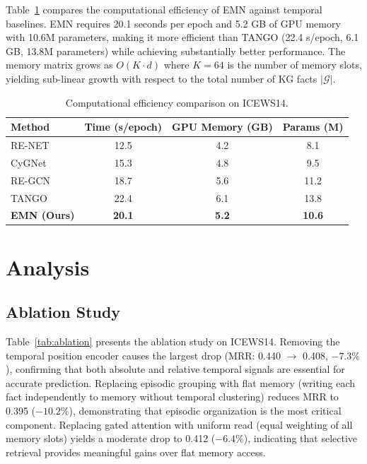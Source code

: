 \documentclass{article}
\begin{document}
Table~\ref{tab:efficiency} compares the computational efficiency of EMN against temporal baselines. EMN requires 20.1 seconds per epoch and 5.2 GB of GPU memory with 10.6M parameters, making it more efficient than TANGO (22.4 s/epoch, 6.1 GB, 13.8M parameters) while achieving substantially better performance. The memory matrix grows as $O(K \cdot d)$ where $K = 64$ is the number of memory slots, yielding sub-linear growth with respect to the total number of KG facts $|\mathcal{G}|$.

\begin{table}[t]
\centering
\caption{Computational efficiency comparison on ICEWS14.}
\label{tab:efficiency}
\begin{tabular}{lccc}
\toprule
Method & Time (s/epoch) & GPU Memory (GB) & Params (M) \\
\midrule
RE-NET  & 12.5 & 4.2 & 8.1 \\
CyGNet  & 15.3 & 4.8 & 9.5 \\
RE-GCN  & 18.7 & 5.6 & 11.2 \\
TANGO   & 22.4 & 6.1 & 13.8 \\
\textbf{EMN (Ours)} & \textbf{20.1} & \textbf{5.2} & \textbf{10.6} \\
\bottomrule
\end{tabular}
\end{table}

\section{Analysis}
\label{sec:analysis}

\subsection{Ablation Study}
\label{sec:analysis:ablation}

Table~\ref{tab:ablation} presents the ablation study on ICEWS14. Removing the temporal position encoder causes the largest drop (MRR: 0.440 $\rightarrow$ 0.408, $-7.3\%$), confirming that both absolute and relative temporal signals are essential for accurate prediction. Replacing episodic grouping with flat memory (writing each fact independently to memory without temporal clustering) reduces MRR to 0.395 ($-10.2\%$), demonstrating that episodic organization is the most critical component. Replacing gated attention with uniform read (equal weighting of all memory slots) yields a moderate drop to 0.412 ($-6.4\%$), indicating that selective retrieval provides meaningful gains over flat memory access.
\end{document}
